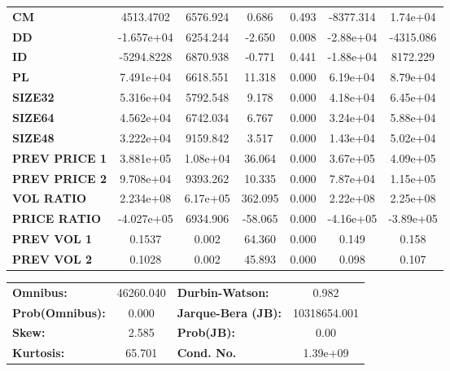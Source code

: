 \documentclass{article}
\begin{document}
\begin{center}
\begin{tabular}{lcccccc}
\textbf{CM}    &    4513.4702  &     6576.924     &     0.686  &         0.493        &    -8377.314    &     1.74e+04     \\
\textbf{DD}    &   -1.657e+04  &     6254.244     &    -2.650  &         0.008        &    -2.88e+04    &    -4315.086     \\
\textbf{ID}    &   -5294.8228  &     6870.938     &    -0.771  &         0.441        &    -1.88e+04    &     8172.229     \\
\textbf{PL}    &    7.491e+04  &     6618.551     &    11.318  &         0.000        &     6.19e+04    &     8.79e+04     \\
\textbf{SIZE32}    &    5.316e+04  &     5792.548     &     9.178  &         0.000        &     4.18e+04    &     6.45e+04     \\
\textbf{SIZE64}   &    4.562e+04  &     6742.034     &     6.767  &         0.000        &     3.24e+04    &     5.88e+04     \\
\textbf{SIZE48}   &    3.222e+04  &     9159.842     &     3.517  &         0.000        &     1.43e+04    &     5.02e+04     \\
\textbf{PREV PRICE 1}   &    3.881e+05  &     1.08e+04     &    36.064  &         0.000        &     3.67e+05    &     4.09e+05     \\
\textbf{PREV PRICE 2}   &    9.708e+04  &     9393.262     &    10.335  &         0.000        &     7.87e+04    &     1.15e+05     \\
\textbf{VOL RATIO}   &    2.234e+08  &     6.17e+05     &   362.095  &         0.000        &     2.22e+08    &     2.25e+08     \\
\textbf{PRICE RATIO}   &   -4.027e+05  &     6934.906     &   -58.065  &         0.000        &    -4.16e+05    &    -3.89e+05     \\
\textbf{PREV VOL 1}   &       0.1537  &        0.002     &    64.360  &         0.000        &        0.149    &        0.158     \\
\textbf{PREV VOL 2}   &       0.1028  &        0.002     &    45.893  &         0.000        &        0.098    &        0.107     \\
\bottomrule
\end{tabular}
\begin{tabular}{lclc}
\textbf{Omnibus:}       & 46260.040 & \textbf{  Durbin-Watson:     } &      0.982    \\
\textbf{Prob(Omnibus):} &    0.000  & \textbf{  Jarque-Bera (JB):  } & 10318654.001  \\
\textbf{Skew:}          &    2.585  & \textbf{  Prob(JB):          } &       0.00    \\
\textbf{Kurtosis:}      &   65.701  & \textbf{  Cond. No.          } &   1.39e+09    \\
\bottomrule
\end{tabular}
\end{center} 
\end{document}
